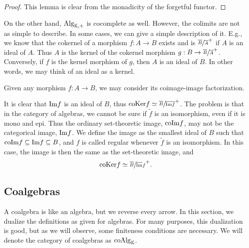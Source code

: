 \documentclass[../thesis.tex]{subfiles}
\begin{document}
                \begin{proof}
                    This lemma is clear from the monadicity of the forgetful functor.
                \end{proof}

                On the other hand, $\tt{Alg}_{\mathbb{K},+}$ is cocomplete as well. However, the colimits are not as simple to describe. In some cases, we can give a simple description of it. E.g., we know that the cokernel of a morphism $f: A \rightarrow B$ exists and is $\sfrac{\overline{B}}{\overline{A}}^+$ if $A$ is an ideal of $A$. Thus $A$ is the kernel of the cokernel morphism $g : B \rightarrow \sfrac{\overline{B}}{\overline{A}}^+$. Conversely, if $f$ is the kernel morphism of $g$, then $A$ is an ideal of $B$. In other words, we may think of an ideal as a kernel.
                
                Given any morphism $f: A \rightarrow B$, we may consider its coimage-image factorization.
                \begin{center}
                \end{center}
                It is clear that $\tt{Im}f$ is an ideal of $B$, thus $\tt{coKer}f \simeq \sfrac{\overline{B}}{\overline{\tt{Im}f}}^+$. The problem is that in the category of algebras, we cannot be sure if $\widetilde{f}$ is an isomorphism, even if it is mono and epi. Thus the ordinary set-theoretic image, $\tt{coIm}f$, may not be the categorical image, $\tt{Im}f$. We define the image as the smallest ideal of $B$ such that $\tt{coIm}f \subseteq \tt{Im}f \subseteq B$, and $f$ is called regular whenever $\widetilde{f}$ is an isomorphism. In this case, the image is then the same as the set-theoretic image, and
                \begin{align*}
                    \tt{coKer}f \simeq \sfrac{\overline{B}}{\overline{\tt{Im}}f}^+\tt{.}
                \end{align*}

    \subsection{Coalgebras}
            A coalgebra is like an algebra, but we reverse every arrow. In this section, we dualize the definitions as given for algebras. For many purposes, this dualization is good, but as we will observe, some finiteness conditions are necessary. We will denote the category of coalgebras as $\tt{coAlg}_\mathbb{K}$.
\end{document}
